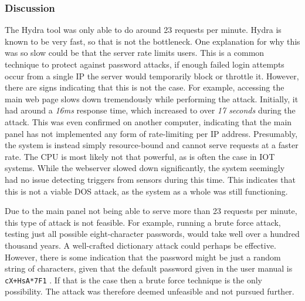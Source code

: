 \subsubsection{Discussion}
The Hydra tool was only able to do around 23 requests per minute. Hydra is known to be very fast, so that is not the bottleneck. One explanation for why this was so slow could be that the server rate limits users. This is a common technique to protect against password attacks, if enough failed login attempts occur from a single IP the server would temporarily block or throttle it. However, there are signs indicating that this is not the case. For example, accessing the main web page slows down tremendously while performing the attack. Initially, it had around a \textit{16ms} response time, which increased to over \textit{17 seconds} during the attack. This was even confirmed on another computer, indicating that the main panel has not implemented any form of rate-limiting per IP address. Presumably, the system is instead simply resource-bound and cannot serve requests at a faster rate. The CPU is most likely not that powerful, as is often the case in \gls{IOT} systems. While the webserver slowed down significantly, the system seemingly had no issue detecting triggers from sensors during this time. This indicates that this is not a viable DOS attack, as the system as a whole was still functioning.

Due to the main panel not being able to serve more than 23 requests per minute, this type of attack is not feasible. For example, running a brute force attack, testing just all possible eight-character passwords, would take well over a hundred thousand years. A well-crafted dictionary attack could perhaps be effective. However, there is some indication that the password might be just a random string of characters, given that the default password given in the user manual is \texttt{cX+HsA*7F1} \cite{hsgw-user-manual}. If that is the case then a brute force technique is the only possibility. The attack was therefore deemed unfeasible and not pursued further.
